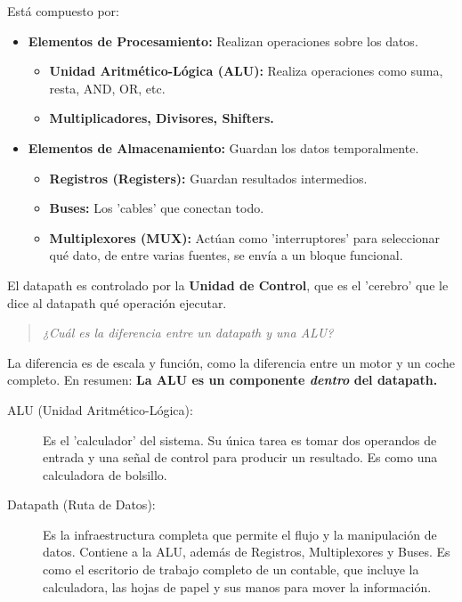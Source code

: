 \documentclass[12pt,a4paper]{article}
\newenvironment{pregunta}
  {\begin{leftbar}\begin{quote}\itshape}
  {\end{quote}\end{leftbar}}
\begin{document}
Está compuesto por:
\begin{itemize}
    \item \textbf{Elementos de Procesamiento:} Realizan operaciones sobre los datos.
    \begin{itemize}
        \item \textbf{Unidad Aritmético-Lógica (ALU):} Realiza operaciones como suma, resta, AND, OR, etc.
        \item \textbf{Multiplicadores, Divisores, Shifters.}
    \end{itemize}
    \item \textbf{Elementos de Almacenamiento:} Guardan los datos temporalmente.
    \begin{itemize}
        \item \textbf{Registros (Registers):} Guardan resultados intermedios.
        \item \textbf{Buses:} Los 'cables' que conectan todo.
        \item \textbf{Multiplexores (MUX):} Actúan como 'interruptores' para seleccionar qué dato, de entre varias fuentes, se envía a un bloque funcional.
    \end{itemize}
\end{itemize}
El datapath es controlado por la \textbf{Unidad de Control}, que es el 'cerebro' que le dice al datapath qué operación ejecutar.

\begin{pregunta}
¿Cuál es la diferencia entre un datapath y una ALU?
\end{pregunta}

La diferencia es de escala y función, como la diferencia entre un motor y un coche completo. En resumen: \textbf{La ALU es un componente \textit{dentro} del datapath.}

\begin{description}
    \item[ALU (Unidad Aritmético-Lógica):] Es el 'calculador' del sistema. Su única tarea es tomar dos operandos de entrada y una señal de control para producir un resultado. Es como una calculadora de bolsillo.
    \item[Datapath (Ruta de Datos):] Es la infraestructura completa que permite el flujo y la manipulación de datos. Contiene a la ALU, además de Registros, Multiplexores y Buses. Es como el escritorio de trabajo completo de un contable, que incluye la calculadora, las hojas de papel y sus manos para mover la información.
\end{description}
\end{document}
